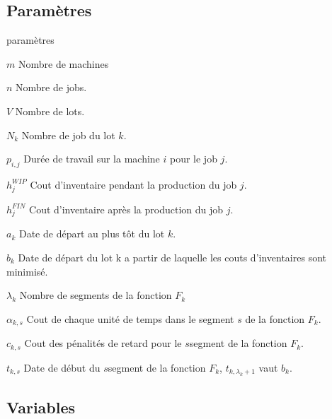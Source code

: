 \subsection{Paramètres}
\begin{labeling}{paramètres}
	\item [$m$]
	Nombre de machines
	\item [$n$]
	Nombre de jobs.
	\item [$V$]
	Nombre de lots.
	\item [$N_k$]
	Nombre de job du lot $k$.
	\item [$p_{i, j}$]
	Durée de travail sur la machine $i$ pour le job $j$.
	\item [$h_{j}^{WIP}$] 
	Cout d'inventaire pendant la production du job $j$.
	\item [$h_{j}^{FIN}$] 
	Cout d'inventaire après la production du job $j$.
	\item [$a_k$]
	Date de départ au plus tôt du lot $k$.
	\item [$b_k$]
	Date de départ du lot k a partir de laquelle les couts d'inventaires sont minimisé.
	\item [$\lambda_k$]
	Nombre de segments de la fonction $F_k$
	\item [$\alpha_{k, s}$]
	Cout de chaque unité de temps dans le segment $s$ de la fonction $F_k$.
	\item [$c_{k, s}$]
	Cout des pénalités de retard pour le $s$\ieme segment de la fonction $F_k$.
	\item [$t_{k, s}$]
	Date de début du $s$\ieme segment de la fonction $F_k$, $t_{k, \lambda_k+1}$ vaut $b_k$.
	
\end{labeling}


\subsection{Variables}

